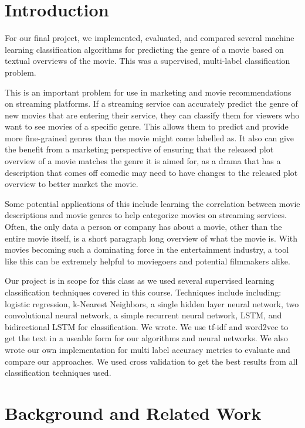 \documentclass[sigconf]{acmart}
\begin{document}
\section{Introduction}
For our final project, we implemented, evaluated, and compared several machine learning classification algorithms for predicting the genre of a movie based on textual overviews of the movie.  This was a supervised, multi-label classification problem.

This is an important problem for use in marketing and movie recommendations on streaming platforms. If a streaming service can accurately predict the genre of new movies that are entering their service, they can classify them for viewers who want to see movies of a specific genre. This allows them to predict and provide more fine-grained genres than the movie might come labelled as. It also can give the benefit from a marketing perspective of ensuring that the released plot overview of a movie matches the genre it is aimed for, as a drama that has a description that comes off comedic may need to have changes to the released plot overview to better market the movie.

Some potential applications of this include learning the correlation between movie descriptions and movie genres to help categorize movies on streaming services.  Often, the only data a person or company has about a movie, other than the entire movie itself, is a short paragraph long overview of what the movie is.  With movies becoming such a dominating force in the entertainment industry, a tool like this can be extremely helpful to moviegoers and potential filmmakers alike.

Our project is in scope for this class as we used several supervised learning classification techniques covered in this course. Techniques include including: logistic regression, k-Nearest Neighbors, a single hidden layer neural network, two convolutional neural network, a simple recurrent neural network, LSTM, and bidirectional LSTM for classification.  We wrote. We use tf-idf and word2vec to get the text in a useable form for our algorithms and neural networks. We also wrote our own implementation for multi label accuracy metrics to evaluate and compare our approaches.  We used cross validation to get the best results from all classification techniques used. 


\section{Background and Related Work}
\end{document}
